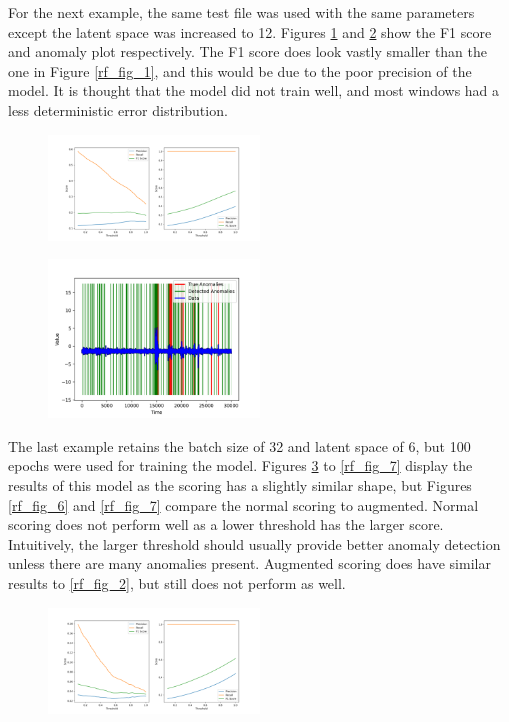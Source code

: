 \documentclass[conference]{IEEEtran}
\begin{document}
For the next example, the same test file was used with the same parameters except the latent space was increased to 12. Figures \ref{rf_fig_3} and \ref{rf_fig_4} show the F1 score and anomaly plot respectively. The F1 score does look vastly smaller than the one in Figure \ref{rf_fig_1}, and this would be due to the poor precision of the model. It is thought that the model did not train well, and most windows had a less deterministic error distribution. 

\begin{figure}[htbp]
    \centering
    \includegraphics[width=0.5\textwidth]{rf_fig_3.png}
    \caption{}
    \label{rf_fig_3}
\end{figure}

\begin{figure}[htbp]
    \centering
    \includegraphics[width=0.5\textwidth]{rf_fig_4.png}
    \caption{}
    \label{rf_fig_4}
\end{figure}

The last example retains the batch size of 32 and latent space of 6, but 100 epochs were used for training the model. Figures \ref{rf_fig_5} to \ref{rf_fig_7} display the results of this model as the scoring has a slightly similar shape, but Figures \ref{rf_fig_6} and \ref{rf_fig_7} compare the normal scoring to augmented. Normal scoring does not perform well as a lower threshold has the larger score. Intuitively, the larger threshold should usually provide better anomaly detection unless there are many anomalies present. Augmented scoring does have similar results to \ref{rf_fig_2}, but still does not perform as well.

\begin{figure}[htbp]
    \centering
    \includegraphics[width=0.5\textwidth]{rf_fig_5.png}
    \caption{}
    \label{rf_fig_5}
\end{figure}
\end{document}
